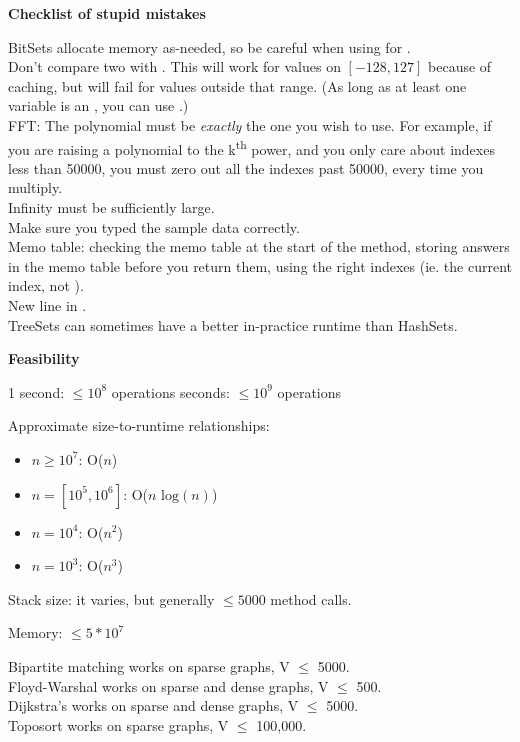 
\textbf{Checklist of stupid mistakes}

\indent BitSets allocate memory as-needed, so be careful when using  for . \\
\indent Don't compare two  with \inline{==}. This will work for values on $[-128, 127]$ because of caching, but will fail for values outside that range. (As long as at least one variable is an , you can use \inline{==}.) \\
\indent FFT: The polynomial must be \textit{exactly} the one you wish to use. For example, if you are raising a polynomial to the k\textsuperscript{th} power, and you only care about indexes less than 50000, you must zero out all the indexes past 50000, every time you multiply. \\
\indent Infinity must be sufficiently large. \\
\indent Make sure you typed the sample data correctly. \\
\indent Memo table: checking the memo table at the start of the method, storing answers in the memo table before you return them, using the right indexes (ie. the current index, not ). \\
\indent New line in . \\ 
\indent TreeSets can sometimes have a better in-practice runtime than HashSets. 

\textbf{Feasibility}

1 second: $\leq 10^8$ operations \indent{} seconds: $\leq 10^9$ operations

Approximate size-to-runtime relationships:
\begin{itemize}
    \item $n \geq 10^7$: O($n$)
    \item $n = [10^5, 10^6]$: O($n\text{ log}(n)$)
    \item $n = 10^4$: O($n^2$)
    \item $n = 10^3$: O($n^3$)
\end{itemize}

Stack size: it varies, but generally $\leq 5000$ method calls.

Memory: $\leq 5*10^7$

Bipartite matching works on sparse graphs, V $\leq$ 5000. \\
Floyd-Warshal works on sparse and dense graphs, V $\leq$ 500. \\
Dijkstra’s works on sparse and dense graphs, V $\leq$ 5000. \\
Toposort works on sparse graphs, V $\leq$ 100,000.

